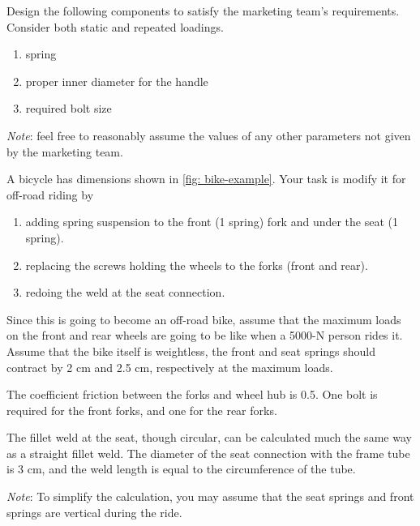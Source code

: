 \documentclass[
10pt,
a4paper,
openany,
svgnames,
]{book}
\newcommand{\exercise}{%
\item \label{lab:\arabic{chapter}.\arabic{exercisesi}}  %
}
\begin{document}
\begin{exercises}
  Design the following components to satisfy the marketing team's
  requirements. Consider both static and repeated loadings.
  
  \begin{enumerate}
  \item spring
  \item proper inner diameter for the handle
  \item required bolt size
  \end{enumerate}
  
  \emph{Note}: feel free to reasonably assume the values of any other
  parameters not given by the marketing team.
  
  \exercise \label{exercise: bike-total-redesign} A bicycle has dimensions shown in \cref{fig: bike-example}. Your task is modify it for off-road riding by
  \begin{enumerate}
  \item adding spring suspension to the front (1 spring) fork and under the seat (1 spring).
  \item replacing the screws holding the wheels to the forks (front and rear).
  \item redoing the weld at the seat connection.
  \end{enumerate}
  
  Since this is going to become an off-road bike, assume that the maximum loads on the front and rear wheels are going to be like when a 5000-N person rides it. Assume that the bike itself is weightless, the front and seat springs should contract by 2 cm and 2.5 cm, respectively at the maximum loads.
  
  The coefficient friction between the forks and wheel hub is 0.5. One bolt is required for the front forks, and one for the rear forks.
  
  The fillet weld at the seat, though circular, can be calculated much the same way as a straight fillet weld. The diameter of the seat connection with the frame tube is 3 cm, and the weld length is equal to the circumference of the tube.
  
  \emph{Note}: To simplify the calculation, you may assume that the seat springs and front springs are vertical during the ride.
  

\end{exercises}
\end{document}
